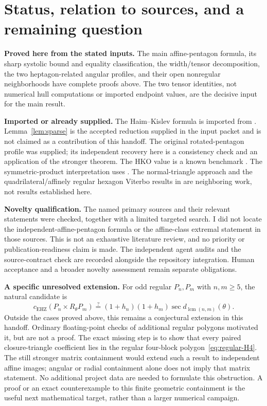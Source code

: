 \documentclass[11pt,a4paper]{article}
\theoremstyle{definition}\newtheorem{definition}[theorem]{Definition}
\theoremstyle{remark}\newtheorem{remark}[theorem]{Remark}
\newcommand{\capc}{c_{\mathrm{EHZ}}}
\begin{document}
\section{Status, relation to sources, and a remaining question}\label{sec:status}
\textbf{Proved here from the stated inputs.} The main affine-pentagon formula, its sharp systolic bound and equality classification, the width/tensor decomposition, the two heptagon-related angular profiles, and their open nonregular neighborhoods have complete proofs above. The two tensor identities, not numerical hull computations or imported endpoint values, are the decisive input for the main result.

\textbf{Imported or already supplied.} The Haim--Kislev formula is imported from \cite{HK}. Lemma~\ref{lem:sparse} is the accepted reduction supplied in the input packet and is not claimed as a contribution of this handoff. The original rotated-pentagon profile was supplied; its independent recovery here is a consistency check and an application of the stronger theorem. The HKO value is a known benchmark \cite{HKO}. The symmetric-product interpretation uses \cite{AAKO}. The normal-triangle approach and the quadrilateral/affinely regular hexagon Viterbo results in \cite{BMP} are neighboring work, not results established here.

\textbf{Novelty qualification.} The named primary sources and their relevant statements were checked, together with a limited targeted search. I did not locate the independent-affine-pentagon formula or the affine-class extremal statement in those sources. This is not an exhaustive literature review, and no priority or publication-readiness claim is made. The independent agent audits and the source-contract check are recorded alongside the repository integration. Human acceptance and a broader novelty assessment remain separate obligations.

\textbf{A specific unresolved extension.} For odd regular $P_n,P_m$ with $n,m\ge5$, the natural candidate is
\[
 \capc(P_n\times R_\theta P_m)
 \stackrel{?}{=}(1+h_n)(1+h_m)\sec d_{\operatorname{lcm}(n,m)}(\theta).
\]
Outside the cases proved above, this remains a conjectural extension in this handoff. Ordinary floating-point checks of additional regular polygons motivated it, but are not a proof. The exact missing step is to show that every paired closure-triangle coefficient lies in the regular four-block polygon~\eqref{eq:regular-H4}. The still stronger matrix containment would extend such a result to independent affine images; angular or radial containment alone does not imply that matrix statement. No additional project data are needed to formulate this obstruction. A proof or an exact counterexample to this finite geometric containment is the useful next mathematical target, rather than a larger numerical campaign.
\end{document}
